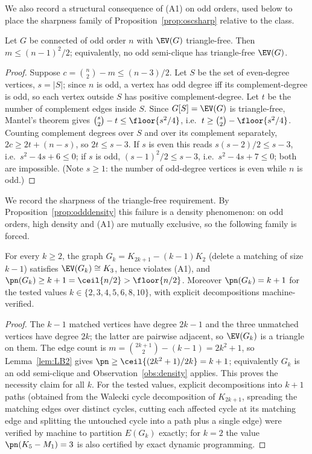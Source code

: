 We also record a structural consequence of (A1) on odd orders, used below to place the
sharpness family of Proposition~\ref{prop:oscsharp} relative to the class.

\begin{proposition}\label{prop:odddensity}
Let $G$ be connected of odd order $n$ with $\EV(G)$ triangle-free. Then
$m\le (n-1)^2/2$; equivalently, no odd semi-clique has triangle-free
$\EV(G)$.
\end{proposition}
\begin{proof}
Suppose $c=\binom{n}{2}-m\le (n-3)/2$. Let $S$ be the set of even-degree
vertices, $s=|S|$; since $n$ is odd, a vertex has odd degree iff its
complement-degree is odd, so each vertex outside $S$ has positive
complement-degree. Let $t$ be the number of complement edges inside $S$.
Since $G[S]=\EV(G)$ is triangle-free, Mantel's theorem gives
$\binom{s}{2}-t\le\floor{s^2/4}$, i.e.\ $t\ge \binom{s}{2}-\floor{s^2/4}$.
Counting complement degrees over $S$ and over its complement separately,
$2c\ge 2t+(n-s)$, so $2t\le s-3$. If $s$ is even this reads
$s(s-2)/2\le s-3$, i.e.\ $s^2-4s+6\le0$; if $s$ is odd,
$(s-1)^2/2\le s-3$, i.e.\ $s^2-4s+7\le0$; both are impossible. (Note
$s\ge1$: the number of odd-degree vertices is even while $n$ is odd.)
\end{proof}

We record the sharpness of the triangle-free requirement. By
Proposition~\ref{prop:odddensity} this failure is a density phenomenon: on odd orders, high
density and (A1) are mutually exclusive, so the following family is forced.

\begin{proposition}\label{prop:oscsharp}
For every $k\ge 2$, the graph $G_k=K_{2k+1}-(k-1)K_2$ (delete a matching of size $k-1$)
satisfies $\EV(G_k)\cong K_3$, hence violates (A1), and
$\pn(G_k)\ge k+1=\ceil{n/2}>\floor{n/2}$. Moreover $\pn(G_k)=k+1$ for the tested values
$k\in\{2,3,4,5,6,8,10\}$, with explicit decompositions machine-verified.
\end{proposition}

\begin{proof}
The $k-1$ matched vertices have degree $2k-1$ and the three unmatched vertices have degree
$2k$; the latter are pairwise adjacent, so $\EV(G_k)$ is a triangle on them. The edge count is
$m=\binom{2k+1}{2}-(k-1)=2k^2+1$, so Lemma~\ref{lem:LB2} gives
$\pn\ge\ceil{(2k^2+1)/2k}=k+1$; equivalently $G_k$ is an odd semi-clique and
Observation~\ref{obs:density} applies. This proves the necessity claim for all $k$. For the
tested values, explicit decompositions into $k+1$ paths (obtained from the Walecki cycle
decomposition of $K_{2k+1}$, spreading the matching edges over distinct cycles, cutting each
affected cycle at its matching edge and splitting the untouched cycle into a path plus a single
edge) were verified by machine to partition $E(G_k)$ exactly; for $k=2$ the value
$\pn(K_5-M_1)=3$ is also certified by exact dynamic programming.
\end{proof}

